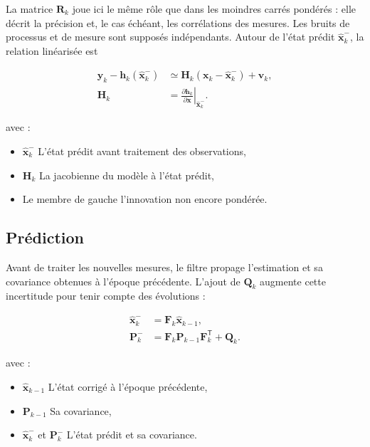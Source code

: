 La matrice $\mathbf R_k$ joue ici le même rôle que dans les moindres carrés
pondérés : elle décrit la précision et, le cas échéant, les corrélations des
mesures. Les bruits de processus et de mesure sont supposés indépendants.
Autour de l'état prédit $\widehat{\mathbf x}_k^-$, la relation linéarisée est

\begin{align}
\mathbf y_k-\mathbf h_k(\widehat{\mathbf x}_k^-)
&\simeq
\mathbf H_k
\left(\mathbf x_k-\widehat{\mathbf x}_k^-\right)
+\mathbf v_k,
\\
\mathbf H_k
&=
\left.
\frac{\partial\mathbf h_k}{\partial\mathbf x}
\right|_{\widehat{\mathbf x}_k^-}.
\label{ann:eq:ekf_linearization}
\end{align}

avec :

\begin{itemize}
    \item $\widehat{\mathbf x}_k^-$ L'état prédit avant traitement des
    observations,
    \item $\mathbf H_k$ La jacobienne du modèle à l'état prédit,
    \item Le membre de gauche l'innovation non encore pondérée.
\end{itemize}

\subsection{Prédiction}

Avant de traiter les nouvelles mesures, le filtre propage l'estimation et sa covariance obtenues
à l'époque précédente. L'ajout de $\mathbf Q_k$ augmente cette incertitude
pour tenir compte des évolutions :

\begin{align}
\widehat{\mathbf x}_k^-
&=
\mathbf F_k\widehat{\mathbf x}_{k-1},
\\
\mathbf P_k^-
&=
\mathbf F_k\mathbf P_{k-1}\mathbf F_k^{\mathsf T}
+\mathbf Q_k.
\label{ann:eq:ekf_predict}
\end{align}

avec :

\begin{itemize}
    \item $\widehat{\mathbf x}_{k-1}$ L'état corrigé à l'époque précédente,
    \item $\mathbf P_{k-1}$ Sa covariance,
    \item $\widehat{\mathbf x}_k^-$ et $\mathbf P_k^-$ L'état prédit et sa
    covariance.
\end{itemize}

